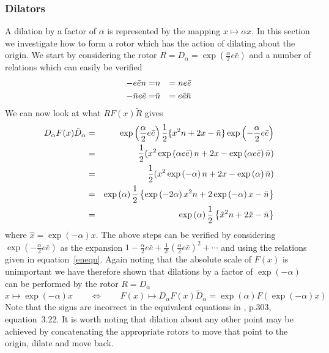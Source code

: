 \subsubsection{Dilators}


A dilation by a factor of $\alpha$ is represented by the mapping
$x \mapsto \alpha x$. In this section we investigate how
to form a rotor which has the action of dilating about the
origin. We start by considering the rotor $R = D_{\alpha} =
\exp\left({\frac{\alpha}{2}e\bar{e}}\right)$ and a number of
relations which can easily be verified
%
\begin{eqnarray}
   -e\bar{e}n  = &  {n} & = ne\bar{e}  \nonumber \\
   -\bar{n}e\bar{e} = &  \bar{n} & =  e\bar{e}\bar{n}  \label{eneqn}
\end{eqnarray}
%
We can now look at what $RF(x)\tilde{R}$ gives
%
\begin{eqnarray}
D_\alpha F(x) \tilde{D}_\alpha & = & \exp\left({\frac{\alpha}{2}e\bar{e}}\right)\frac{1}{2}\{ x^2n + 2x - \bar{n}\}\exp\left({-\frac{\alpha}{2}e\bar{e}}\right) \nonumber \\
   &  =  &  \frac{1}{2}(x^2  \exp\left({\alpha e\bar{e}}\right)n + 2x - \exp\left({\alpha e\bar{e}}\right)\bar{n}) \nonumber \\
   & = &  \frac{1}{2}(x^2 \exp\left({-\alpha}\right) n + 2x - \exp\left({\alpha}\right)\bar{n}) \nonumber \\
   & = & \exp\left({\alpha}\right)\frac{1}{2}\left\{\exp\left({-2\alpha}\right)x^2n + 2\exp\left({-\alpha}\right)x - \bar{n}\right\} \nonumber \\
   & = & \exp\left({\alpha}\right)\frac{1}{2}\left\{\hat{x}^2n + 2\hat{x} -\bar{n}\right\}
\label{Deqn}
\end{eqnarray}
%
where $\hat{x} = \exp\left({-\alpha}\right)x$. The above steps can be
verified by considering $\exp\left({-\frac{\alpha}{2}e\bar{e}}\right)$ as
the expansion $1 - \frac{\alpha}{2}e\bar{e} +
\frac{1}{2!}\left(\frac{\alpha}{2}e\bar{e}\right)^2 +
\cdots$ and using the relations given in
equation~\ref{eneqn}.
Again noting that the absolute scale of $F(x)$ is unimportant we
have therefore shown that dilations by a factor of $\exp\left({-\alpha}\right)$ 
can be performed by the rotor $R=D_\alpha$
 \begin{equation}
x \mapsto \exp({-\alpha})x \qquad \Leftrightarrow \qquad F(x)
\mapsto  D_{\alpha} F(x) \tilde{D}_{\alpha} =
\exp({\alpha})F(\exp({-\alpha})x)
\end{equation}
%
Note that the signs are incorrect in the equivalent
equations in \cite{hestenes}, p.303, equation~3.22. It is worth noting
that dilation about any other point may be achieved by concatenating the
appropriate rotors to move that point to the origin, dilate and move back.


